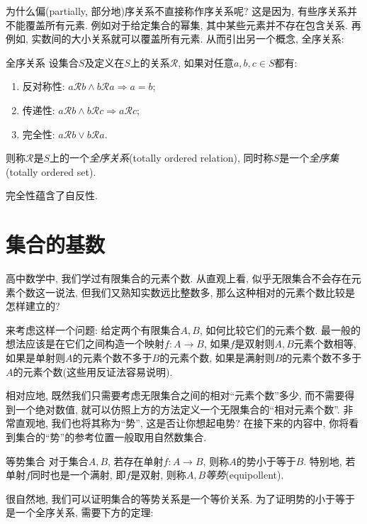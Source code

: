 为什么偏(partially, 部分地)序关系不直接称作序关系呢? 这是因为, 有些序关系并不能覆盖所有元素. 例如对于给定集合的幂集, 其中某些元素并不存在包含关系. 再例如, 实数间的大小关系就可以覆盖所有元素. 从而引出另一个概念, 全序关系: 

\begin{definition}{全序关系}
	设集合$S$及定义在$S$上的关系$\mathcal{R}$, 如果对任意$a, b, c \in S$都有: 
	\begin{enumerate}
		\item 反对称性: $a\mathcal{R} b \wedge b\mathcal{R} a \Rightarrow a=b$; 
		\item 传递性: $a\mathcal{R} b \wedge b\mathcal{R} c \Rightarrow a\mathcal{R} c$; 
		\item 完全性: $a\mathcal{R} b \vee b\mathcal{R} a$.
	\end{enumerate}
	则称$\mathcal{R}$是$S$上的一个\textit{全序关系}(totally ordered relation), 同时称$S$是一个\textit{全序集}(totally ordered set).
\end{definition}
\begin{remark}
	完全性蕴含了自反性.
\end{remark}

\newpage
\section{集合的基数}

高中数学中, 我们学过有限集合的元素个数. 从直观上看, 似乎无限集合不会存在元素个数这一说法, 但我们又熟知实数远比整数多, 那么这种相对的元素个数比较是怎样建立的? 

来考虑这样一个问题: 给定两个有限集合$A, B$, 如何比较它们的元素个数. 最一般的想法应该是在它们之间构造一个映射$f: A \to B$, 如果$f$是双射则$A, B$元素个数相等, 如果是单射则$A$的元素个数不多于$B$的元素个数, 如果是满射则$B$的元素个数不多于$A$的元素个数(这些用反证法容易说明). 

相对应地, 既然我们只需要考虑无限集合之间的相对“元素个数”多少, 而不需要得到一个绝对数值, 就可以仿照上方的方法定义一个无限集合的“相对元素个数”. 非常直观地, 我们也将其称为“势”, 这是否让你想起电势? 在接下来的内容中, 你将看到集合的“势”的参考位置一般取用自然数集合. 

\begin{definition}{等势集合}
	对于集合$A, B$, 若存在单射$f: A \to B$, 则称$A$的势小于等于$B$. 特别地, 若单射$f$同时也是一个满射, 即$f$是双射, 则称$A, B$\textit{等势}(equipollent). 
\end{definition}

很自然地, 我们可以证明集合的等势关系是一个等价关系. 为了证明势的小于等于是一个全序关系, 需要下方的定理: 


